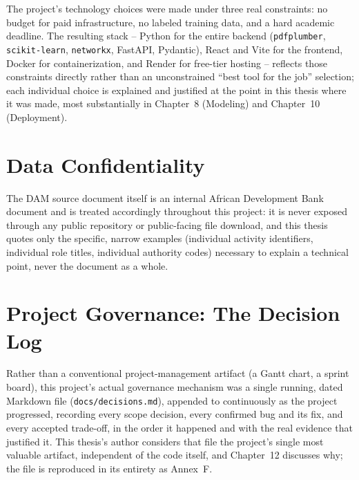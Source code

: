 The project's technology choices were made under three real constraints: no budget for paid infrastructure, no labeled training data, and a hard academic deadline. The resulting stack -- Python for the entire backend (\texttt{pdfplumber}, \texttt{scikit-learn}, \texttt{networkx}, FastAPI, Pydantic), React and Vite for the frontend, Docker for containerization, and Render for free-tier hosting -- reflects those constraints directly rather than an unconstrained ``best tool for the job'' selection; each individual choice is explained and justified at the point in this thesis where it was made, most substantially in Chapter~8 (Modeling) and Chapter~10 (Deployment).

\section{Data Confidentiality}

The DAM source document itself is an internal African Development Bank document and is treated accordingly throughout this project: it is never exposed through any public repository or public-facing file download, and this thesis quotes only the specific, narrow examples (individual activity identifiers, individual role titles, individual authority codes) necessary to explain a technical point, never the document as a whole.

\section{Project Governance: The Decision Log}

Rather than a conventional project-management artifact (a Gantt chart, a sprint board), this project's actual governance mechanism was a single running, dated Markdown file (\texttt{docs/decisions.md}), appended to continuously as the project progressed, recording every scope decision, every confirmed bug and its fix, and every accepted trade-off, in the order it happened and with the real evidence that justified it. This thesis's author considers that file the project's single most valuable artifact, independent of the code itself, and Chapter~12 discusses why; the file is reproduced in its entirety as Annex~F.

